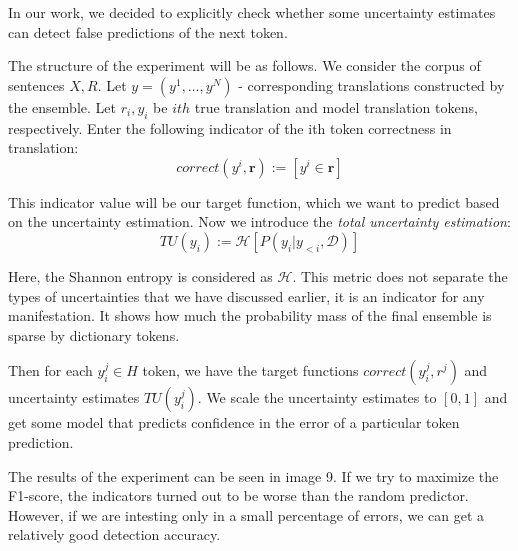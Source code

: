 \documentclass[a4paper,14pt]{extarticle}
\begin{document}
	In our work, we decided to explicitly check whether some uncertainty estimates can detect false predictions of the next token.

	The structure of the experiment will be as follows. We consider the corpus of sentences $X, R$. Let $y = (y^1, \dots, y^N)$ - corresponding translations constructed by the ensemble. Let $r_{i}, y_{i}$ be $ith$  true translation and model translation tokens, respectively. Enter the following indicator of the ith token correctness in translation:
	\begin{equation}
		correct(y^{i}, \textbf{r}) := [y^{i} \in \textbf{r}]
	\end{equation}
	
	This indicator value will be our target function, which we want to predict based on the uncertainty estimation. Now we introduce the \textit{total uncertainty estimation}:
	\begin{equation}
		TU(y_i) := \mathcal{H}[P(y_i|y_{<i}, \mathcal{D})]
	\end{equation}
	
	Here, the Shannon entropy is considered as $\mathcal{H}$. This metric does not separate the types of uncertainties that we have discussed earlier, it is an indicator for any manifestation. It shows how much the probability mass of the final ensemble is sparse by dictionary tokens.

	Then for each $y_i^j \in H$ token, we have the target functions $correct(y_i^j, r^j)$ and uncertainty estimates $TU (y_i^j)$. We scale the uncertainty estimates to $[0, 1]$ and get some model that predicts confidence in the error of a particular token prediction.
	
	\begin{figure}[t]
	\end{figure}
	The results of the experiment can be seen in image 9. If we try to maximize the F1-score, the indicators turned out to be worse than the random predictor. However, if we are intesting only in a small percentage of errors, we can get a relatively good detection accuracy.
\end{document}
